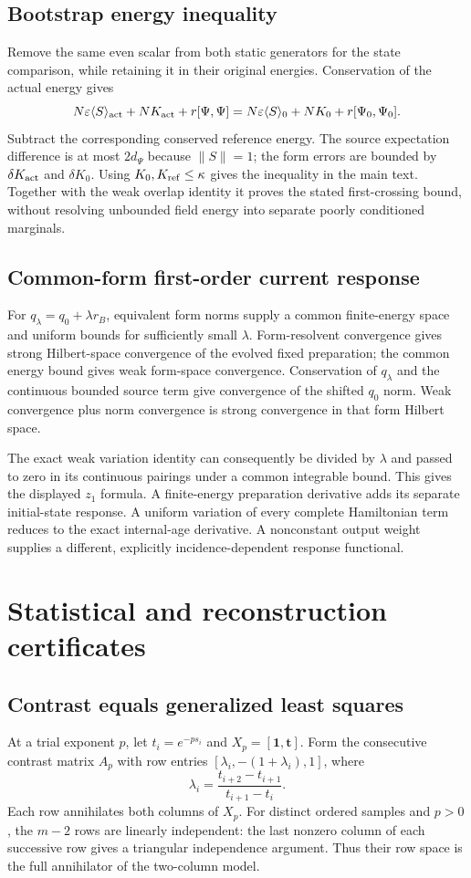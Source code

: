 \documentclass[10pt,twocolumn,letterpaper]{article}
\begin{document}
\subsection{Bootstrap energy inequality}
Remove the same even scalar from both static generators for the state comparison, while retaining it in their original energies. Conservation of the actual energy gives
\[
 N\varepsilon\langle S\rangle_{\rm act}+NK_{\rm act}+r[\Psi,\Psi]
 =N\varepsilon\langle S\rangle_0+NK_0+r[\Psi_0,\Psi_0].
\]
Subtract the corresponding conserved reference energy. The source expectation difference is at most $2d_\Psi$ because $\|S\|=1$; the form errors are bounded by $\delta K_{\rm act}$ and $\delta K_0$. Using $K_0,K_{\rm ref}\le\kappa$ gives the inequality in the main text. Together with the weak overlap identity it proves the stated first-crossing bound, without resolving unbounded field energy into separate poorly conditioned marginals.

\subsection{Common-form first-order current response}
For $q_\lambda=q_0+\lambda r_B$, equivalent form norms supply a common finite-energy space and uniform bounds for sufficiently small $\lambda$. Form-resolvent convergence gives strong Hilbert-space convergence of the evolved fixed preparation; the common energy bound gives weak form-space convergence. Conservation of $q_\lambda$ and the continuous bounded source term give convergence of the shifted $q_0$ norm. Weak convergence plus norm convergence is strong convergence in that form Hilbert space.

The exact weak variation identity can consequently be divided by $\lambda$ and passed to zero in its continuous pairings under a common integrable bound. This gives the displayed $z_1$ formula. A finite-energy preparation derivative adds its separate initial-state response. A uniform variation of every complete Hamiltonian term reduces to the exact internal-age derivative. A nonconstant output weight supplies a different, explicitly incidence-dependent response functional.

\section{Statistical and reconstruction certificates}\label{app:statistics}
\subsection{Contrast equals generalized least squares}
At a trial exponent $p$, let $t_i=e^{-ps_i}$ and $X_p=[\bm 1,\bm t]$. Form the consecutive contrast matrix $A_p$ with row entries $[\lambda_i,-(1+\lambda_i),1]$, where
\[
 \lambda_i=\frac{t_{i+2}-t_{i+1}}{t_{i+1}-t_i}.
\]
Each row annihilates both columns of $X_p$. For distinct ordered samples and $p>0$, the $m-2$ rows are linearly independent: the last nonzero column of each successive row gives a triangular independence argument. Thus their row space is the full annihilator of the two-column model.
\end{document}
